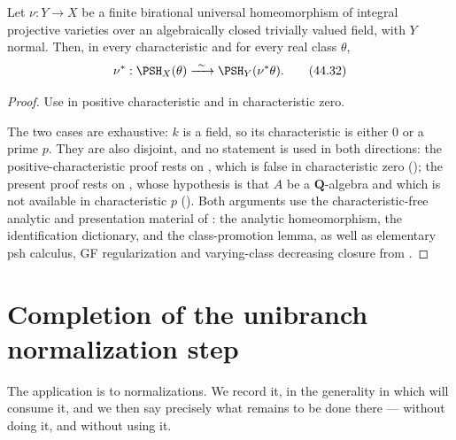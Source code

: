 \begin{corollary}\label{cor:bj-universal-reflection-all-characteristics}
Let $\nu:Y\to X$ be a finite birational universal homeomorphism of integral
projective varieties over an algebraically closed trivially valued field,
with $Y$ normal.
Then, in every characteristic and for every real class $\theta$,
\[
 \nu^*:\PSH_X(\theta)
       \xrightarrow{\ \sim\ }
       \PSH_Y(\nu^*\theta).
\tag{44.32}\label{eq:bj-universal-reflection-all-characteristics}
\]
\end{corollary}

\begin{proof}
Use  in positive characteristic
and  in characteristic zero.

The two cases are exhaustive: $k$ is a field, so its characteristic is
either $0$ or a prime $p$.  They are also disjoint, and no statement is
used in both directions: the positive-characteristic proof rests on
, which is false in characteristic zero
(); the present proof rests on
, whose hypothesis is that $A$ be a
$\mathbf Q$-algebra and which is not available in characteristic $p$
().  Both arguments use the characteristic-free analytic and presentation
material of
: the analytic homeomorphism, the
identification dictionary, and the class-promotion lemma, as well as
elementary psh calculus, GF regularization and varying-class decreasing
closure from .
\end{proof}

\section{Completion of the unibranch normalization step}
\label{sec:ch44-unibranch}

The application is to normalizations.  We record it, in the generality in
which  will consume it, and we then say
precisely what remains to be done there --- without doing it, and without
using it.

